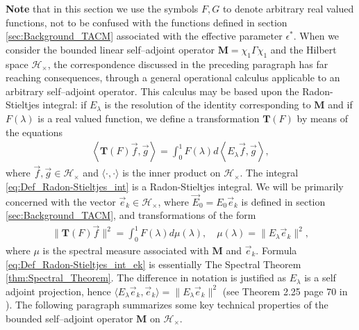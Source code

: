 \documentclass[english,12pt]{ttuthes}
\begin{document}
\textbf{Note} that in this section we use the symbols $F,G$ to denote
arbitrary real valued functions, not to be confused with the functions
defined in section \ref{sec:Background_TACM} associated with the
effective parameter $\epsilon^*$. When we consider the bounded linear
self--adjoint operator $\mathbf{M}=\chi_1\Gamma\chi_1$ and the Hilbert space
$\mathscr{H}_\times$, the correspondence discussed in the preceding
paragraph has far reaching consequences, through a general operational
calculus applicable to an arbitrary self--adjoint operator. This
calculus may be based upon the Radon-Stieltjes integral: if $E_\lambda$ is
the resolution of the identity corresponding to $\mathbf{M}$ and if
$F(\lambda)$ is a real valued function, we define a transformation
$\mathbf{T}(F)$ by means of the equations \cite{Stone:64} 
%
\begin{align}\label{eq:Def_Radon-Stieltjes_int}
  \left\langle\mathbf{T}(F)\vec{f},\vec{g}\right\rangle=
      \int_0^1F(\lambda)d\left\langle E_\lambda\vec{f},\vec{g}\right\rangle,
\end{align}
%
where $\vec{f},\vec{g}\in\mathscr{H}_\times$ and $\langle\cdot,\cdot\rangle$ is the inner
product on $\mathscr{H}_\times$. The integral
\eqref{eq:Def_Radon-Stieltjes_int} is a Radon-Stieltjes integral. We 
will be primarily concerned with the vector
$\vec{e}_k\in\mathscr{H}_\times$, where $\vec{E}_0=E_0\vec{e}_k$ is
defined in section \ref{sec:Background_TACM}, and transformations of
the form
%
\begin{align}\label{eq:Def_Radon-Stieltjes_int_ek}
  \|\mathbf{T}(F)\vec{f}\|^2=\int_0^1F(\lambda)d\mu(\lambda),
  \quad \mu(\lambda)=\|E_\lambda\vec{e}_k\|^2,
\end{align}
%
where $\mu$ is the spectral measure associated with $\mathbf{M}$ and
$\vec{e}_k$. Formula \eqref{eq:Def_Radon-Stieltjes_int_ek} is
essentially The Spectral Theorem \ref{thm:Spectral_Theorem}. The
difference in notation is justified as $E_\lambda$ is a self adjoint projection,
hence $\langle E_\lambda\vec{e}_k,\vec{e}_k\rangle=\|E_\lambda\vec{e}_k\|^2$ (see Theorem 2.25
page 70 in \cite{Stone:64}). The following paragraph summarizes some
key technical properties of the bounded self--adjoint operator
$\mathbf{M}$ on $\mathscr{H}_\times$.
\end{document}

